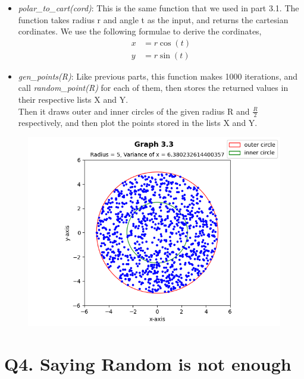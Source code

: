 \documentclass[answers]{exam}
\begin{document}
\begin{framed}
\begin{itemize}
    \item \emph{polar\_to\_cart(cord)}: This is the same function that we used in part 3.1. The function takes radius r and angle t as the input, and returns the cartesian cordinates. We use the following formulae to derive the cordinates,\\
      \begin{align*}
        x &= r\cos(t)\\
        y &= r\sin(t)
      \end{align*}
    \item \emph{gen\_points(R)}: Like previous parts, this function makes 1000 iterations, and call \emph{random\_point(R)} for each of them, then stores the returned values in their respective lists X and Y.\\
      Then it draws outer and inner circles of the given radius R and $\frac{R}{2}$ respectively, and then plot the points stored in the lists X and Y.
  \end{itemize}
\end{framed}


\begin{figure}[h]
  \centering
  \includegraphics[scale=0.7]{Q3/Q3(3).png}
\end{figure}
\pagebreak
\section*{Q4. Saying Random is not enough}

\end{document}
